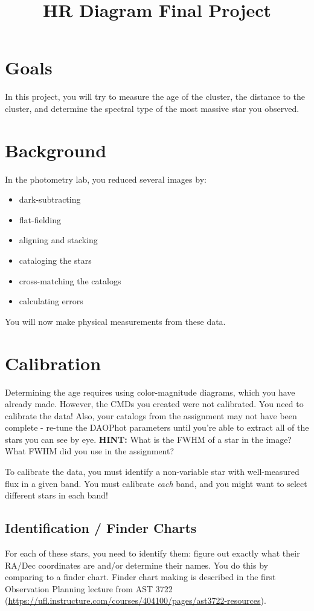 \documentclass[11pt]{article}
\begin{document}
\title{HR Diagram Final Project}

\section{Goals}
In this project, you will try to measure the age of the cluster, the distance
to the cluster, and determine the spectral type of the most massive star you
observed.

\section{Background}
In the photometry lab, you reduced several images by:
\begin{itemize}
    \item dark-subtracting
    \item flat-fielding
    \item aligning and stacking
    \item cataloging the stars
    \item cross-matching the catalogs
    \item calculating errors
\end{itemize}

You will now make physical measurements from these data.


\section{Calibration}

Determining the age requires using color-magnitude diagrams, which you have already made.
However, the CMDs you created were not calibrated.  You need to calibrate the data!
Also, your catalogs from the assignment may not have been complete - re-tune the DAOPhot
parameters until you're able to extract all of the stars you can see by eye.
\textbf{HINT:} What is the FWHM of a star in the image?  What FWHM did you use in the assignment?


To calibrate the data, you must identify a non-variable star with well-measured flux
in a given band.  You must calibrate \emph{each} band, and you might want to select
different stars in each band!

\subsection{Identification / Finder Charts}
For each of these stars, you need to identify them: figure out exactly what their
RA/Dec coordinates are and/or determine their names.  You do this by comparing to
a finder chart.  Finder chart making is described in the first Observation Planning
lecture from AST 3722 (\url{https://ufl.instructure.com/courses/404100/pages/ast3722-resources}).
\end{document}
